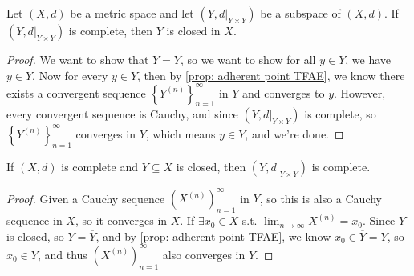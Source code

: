 \begin{proposition}
    Let \((X, d)\) be a metric space and let \(\left( Y, d\vert_{Y \times Y} \right) \) be a subspace of \((X, d)\). If \(\left( Y, d\vert_{Y \times Y} \right) \) is complete, then \(Y\) is closed in \(X\).
\end{proposition}
\begin{proof}
    We want to show that \(Y = \overline{Y} \), so we want to show for all \(y \in \overline{Y} \), we have \(y \in Y\). Now for every \(y \in \overline{Y} \), then by \autoref{prop: adherent point TFAE}, we know there exists a convergent sequence \(\left\{ Y^{(n)} \right\}_{n=1}^{\infty}  \) in \(Y\) and converges to \(y\). However, every convergent sequence is Cauchy, and since \((Y, d\vert_{Y \times Y})\) is complete, so \(\left\{ Y^{(n)} \right\}_{n=1}^{\infty}  \) converges in \(Y\), which means \(y \in Y\), and we're done.        
\end{proof}

\begin{proposition}
    If \((X, d)\) is complete and \(Y \subseteq X\) is closed, then \(\left( Y, d\vert_{Y \times Y} \right) \) is complete.   
\end{proposition}
\begin{proof}
    Given a Cauchy sequence \(\left( X^{(n)} \right)_{n=1}^{\infty}  \) in \(Y\), so this is also a Cauchy sequence in \(X\), so it converges in \(X\). If \(\exists x_0 \in X\) s.t. \(\lim_{n \to \infty} X^{(n)} = x_0 \). Since \(Y\) is closed, so \(Y = \overline{Y} \), and by \autoref{prop: adherent point TFAE}, we know \(x_0 \in \overline{Y} = Y \), so \(x_0 \in Y\), and thus \(\left( X^{(n)} \right)_{n=1}^{\infty }\) also converges in \(Y\).         
\end{proof}